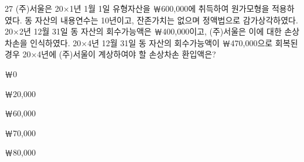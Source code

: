\begin{question}{27}
(주)서울은 20×1년 1월 1일 유형자산을 ￦600,000에 취득하여 원가모형을 적용하였다. 동 자산의 내용연수는 10년이고, 잔존가치는 없으며 정액법으로 감가상각하였다. 20×2년 12월 31일 동 자산의 회수가능액은 ￦400,000이고, (주)서울은 이에 대한 손상차손을 인식하였다. 20×4년 12월 31일 동 자산의 회수가능액이 ￦470,000으로 회복된 경우 20×4년에 (주)서울이 계상하여야 할 손상차손 환입액은?
\begin{choices}
  \item ￦0
  \item ￦20,000
  \item ￦60,000
  \item ￦70,000
  \item ￦80,000
\end{choices}
\end{question}
